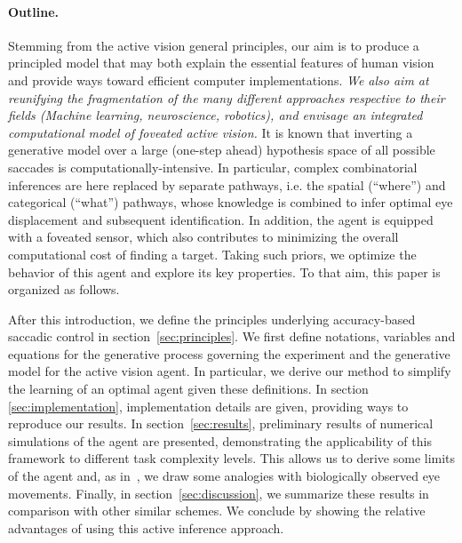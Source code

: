 \ICANN \paragraph{Outline.}\fi
Stemming from the active vision general principles, our aim is to produce a principled model that may both explain the essential features of human vision and provide ways toward efficient computer implementations. \ICANN
\else
\emph{We also aim at reunifying the fragmentation of the many different approaches respective to their fields (Machine learning, neuroscience, robotics), and envisage an integrated computational model of foveated active vision.}
\fi
It is known that inverting a generative model over a large (one-step ahead) hypothesis space of all possible saccades is computationally-intensive. %
In particular, complex combinatorial inferences are here replaced by separate pathways, i.e. the spatial (``where'') and categorical (``what'') pathways, whose knowledge is combined to infer optimal eye displacement and subsequent identification.    
\ICANN In addition,  the agent is equipped with a foveated sensor, %
which also contributes to minimizing the overall computational cost of finding a target. Taking such priors, we optimize the behavior of this agent and explore its key properties.\fi
To that aim, this paper is organized as follows.

After this introduction, we define the principles underlying accuracy-based saccadic control in section~\ref{sec:principles}.  We first define notations, variables and equations for the generative process governing the experiment and the generative model for the active vision agent. In particular, we  derive our method to simplify the learning of an optimal agent given these definitions. In section \ref{sec:implementation}, implementation details are given, providing ways to reproduce our results. In section~\ref{sec:results}, preliminary results of numerical simulations of the agent are presented, demonstrating the applicability of this framework to different task complexity levels. This  allows us to derive some limits of the agent and, as in~\citep{Najemnik05}, we  draw some analogies with biologically observed eye movements. Finally, in section~\ref{sec:discussion}, we  summarize these results in comparison with other similar schemes. We  conclude by showing the relative advantages of using this active inference approach.
